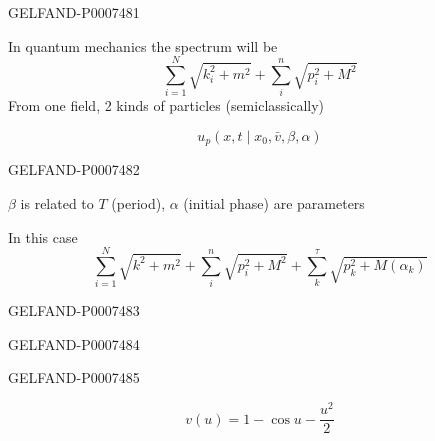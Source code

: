 \begin{GelfandAdjacentEvidence}{GELFAND-P000748}{1}

In quantum mechanics the spectrum will be
\begin{equation*}
\sum_{i=1}^{N}\sqrt{k_i^2+m^2}+\sum_i^n\sqrt{p_i^2+M^2}
\tag{16}
\end{equation*}
From one field, 2 kinds of particles (semiclassically)

\begin{equation*}
u_p(x,t\mid x_0,\bar v,\beta,\alpha)
\tag{17}
\end{equation*}
\end{GelfandAdjacentEvidence}
\begin{GelfandAdjacentEvidence}{GELFAND-P000748}{2}

\(\beta\) is related to \(T\) (period), \(\alpha\) (initial phase) are parameters

In this case
\begin{equation*}
\sum_{i=1}^{N}\sqrt{k^2+m^2}+\sum_i^n\sqrt{p_i^2+M^2}
+\sum_k^\tau\sqrt{p_k^2+M(\alpha_k)}
\tag{18}
\end{equation*}
\end{GelfandAdjacentEvidence}
\begin{GelfandAdjacentEvidence}{GELFAND-P000748}{3}

\end{GelfandAdjacentEvidence}
\begin{GelfandAdjacentEvidence}{GELFAND-P000748}{4}

\end{GelfandAdjacentEvidence}
\begin{GelfandAdjacentEvidence}{GELFAND-P000748}{5}


\begin{equation*}
v(u)=1-\cos u-\frac{u^2}{2}
\tag{19}
\end{equation*}
\end{GelfandAdjacentEvidence}
